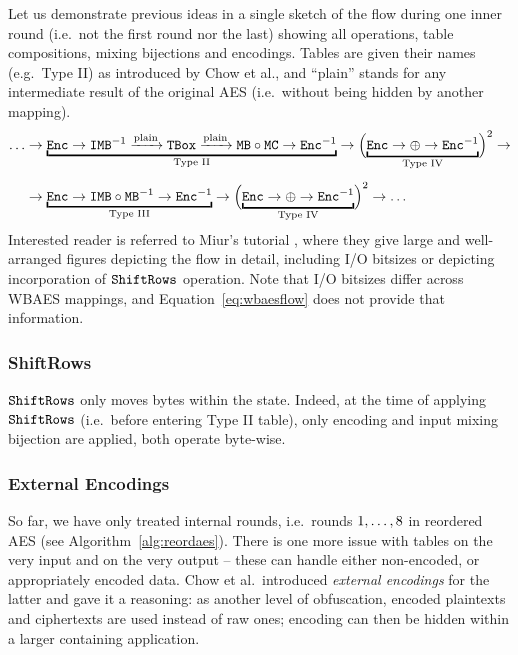 	Let us demonstrate previous ideas in a single sketch of the flow during one inner round (i.e.\ not the first round nor the last) showing all operations, table compositions, mixing bijections and encodings. Tables are given their names (e.g.\ Type II) as introduced by Chow et al., and ``plain'' stands for any intermediate result of the original AES (i.e.\ without being hidden by another mapping).
	\begin{align}
	\label{eq:wbaesflow}
		\ldots&\rarr\underbracket{\Enc\rarr\IMB^{-1}\xrightarrow{\textnormal{plain}}\TBox\xrightarrow{\textnormal{plain}}\MB\circ\MC\rarr\Enc^{-1}}_{\textnormal{Type II}}\rarr\Bigl(\underbracket{\Enc\rarr\xor\rarr\Enc^{-1}}_{\textnormal{Type IV}}\Bigr)^2\rarr\nonumber\\[.5em]
		&\rarr\underbracket{\Enc\rarr\IMB\circ\MB^{-1}\rarr\Enc^{-1}}_{\textnormal{Type III}}\rarr\Bigl(\underbracket{\Enc\rarr\xor\rarr\Enc^{-1}}_{\textnormal{Type IV}}\Bigr)^2\rarr\ldots
	\end{align}
	Interested reader is referred to Miur's tutorial \cite{muir2013tutorial}, where they give large and well-arranged figures depicting the flow in detail, including I/O bitsizes or depicting incorporation of $\texttt{ShiftRows}$ operation. Note that I/O bitsizes differ across WBAES mappings, and Equation~\ref{eq:wbaesflow} does not provide that information.
	
\subsubsection{ShiftRows}
	
	$\texttt{ShiftRows}$ only moves bytes within the state. Indeed, at the time of applying $\texttt{ShiftRows}$ (i.e.\ before entering Type II table), only encoding and input mixing bijection are applied, both operate byte-wise.

\subsubsection{External Encodings}
	
	So far, we have only treated internal rounds, i.e.\ rounds $1 , \ldots , 8$ in reordered AES (see Algorithm~\ref{alg:reordaes}). There is one more issue with tables on the very input and on the very output -- these can handle either non-encoded, or appropriately encoded data. Chow et al.\ introduced {\em external encodings} for the latter and gave it a reasoning: as another level of obfuscation, encoded plaintexts and ciphertexts are used instead of raw ones; encoding can then be hidden within a larger containing application. %
	
